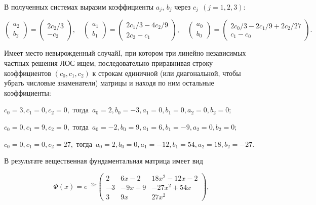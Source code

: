 \documentclass[11pt]{article}
\begin{document}
{\smallskip
В полученных системах выразим коэффициенты $a_j,\,b_j$ через $c_j\ \ (j=1,2,3):$

\smallskip
$ %
\begin{pmatrix}
a_2 \\ b_2
\end{pmatrix}
=
\begin{pmatrix}
2c_2/3 \\ -c_2
\end{pmatrix},
\quad
\begin{pmatrix}
a_1 \\ b_1
\end{pmatrix}
=
\begin{pmatrix}
2c_1/3 - 4c_2/9 \\ 2c_2 - c_1
\end{pmatrix},
\quad
\begin{pmatrix}
a_0 \\ b_0
\end{pmatrix}
=
\begin{pmatrix}
2c_0/3 - 2c_1/9 + 2c_2/27 \\ c_1 - c_0
\end{pmatrix}.
$ %

\smallskip
Имеет место невырожденный случай\;I, при котором три линейно независимых частных решения ЛОС ищем,
последовательно приравнивая строку коэффициентов $(c_0,c_1,c_2)$ к строкам единичной (или диагональной, чтобы убрать числовые знаменатели) матрицы и находя по ним остальные коэффициенты:

\smallskip
$c_0=3, c_1=0, c_2=0,$ тогда \,$a_0=2, b_0=-3, a_1=0, b_1=0, a_2=0, b_2=0;$

$c_0=0, c_1=9, c_2=0,$ тогда \,$a_0=-2, b_0=9, a_1=6, b_1=-9, a_2=0, b_2=0;$

$c_0=0, c_1=0, c_2=27,$ тогда \,$a_0=2, b_0=0, a_1=-12, b_1=54, a_2=18, b_2=-27.$

\smallskip
В результате вещественная фундаментальная матрица имеет вид

\smallskip
$$\Phi(x)=e^{-2x}\begin{pmatrix} 2 & 6x - 2 & 18x^2 - 12x - 2 \\ -3 & - 9x + 9 & - 27x^2 + 54x \\ 3 & 9x & 27x^2 \end{pmatrix},$$ %

}
\end{document}
